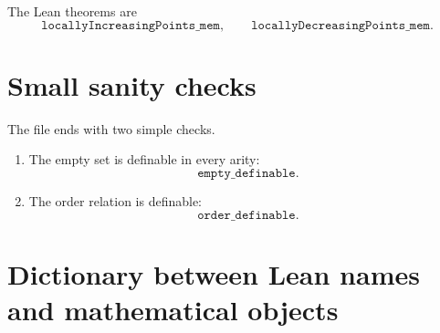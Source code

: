 \documentclass[11pt]{article}
\newcommand{\Lean}[1]{\texttt{#1}}
\begin{document}
The Lean theorems are
\[
  \Lean{locallyIncreasingPoints\_mem},
  \qquad
  \Lean{locallyDecreasingPoints\_mem}.
\]

\section{Small sanity checks}

The file ends with two simple checks.

\begin{enumerate}[label=(\roman*)]
  \item The empty set is definable in every arity:
  \[
    \Lean{empty\_definable}.
  \]
  \item The order relation is definable:
  \[
    \Lean{order\_definable}.
  \]
\end{enumerate}

\section{Dictionary between Lean names and mathematical objects}
\end{document}
